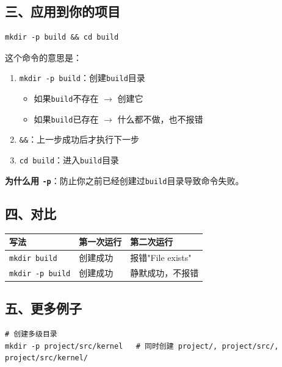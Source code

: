 \documentclass[11pt, a4paper]{article}
\begin{document}
\begin{aibox}
\subsection*{三、应用到你的项目}

\begin{tcolorbox}[colback=white,colframe=gray!50!white,boxrule=0.5pt,arc=2pt,left=5pt,right=5pt,top=5pt,bottom=5pt]
\begin{verbatim}
mkdir -p build && cd build
\end{verbatim}
\end{tcolorbox}

这个命令的意思是：
\begin{enumerate}
    \item \texttt{mkdir -p build}：创建\texttt{build}目录
    \begin{itemize}
        \item 如果\texttt{build}不存在 $\rightarrow$ 创建它
        \item 如果\texttt{build}已存在 $\rightarrow$ 什么都不做，也不报错
    \end{itemize}
    \item \texttt{\&\&}：上一步成功后才执行下一步
    \item \texttt{cd build}：进入\texttt{build}目录
\end{enumerate}

\textbf{为什么用 \texttt{-p}}：防止你之前已经创建过\texttt{build}目录导致命令失败。

\subsection*{四、对比}

\vspace{0.5em}
\begin{tabularx}{\textwidth}{@{} l X X @{}}
\toprule
写法 & 第一次运行 & 第二次运行 \\
\midrule
\texttt{mkdir build} & 创建成功 & 报错"File exists" \\
\texttt{mkdir -p build} & 创建成功 & 静默成功，不报错 \\
\bottomrule
\end{tabularx}
\vspace{0.5em}

\subsection*{五、更多例子}

\begin{tcolorbox}[colback=white,colframe=gray!50!white,boxrule=0.5pt,arc=2pt,left=5pt,right=5pt,top=5pt,bottom=5pt]
\begin{verbatim}
# 创建多级目录
mkdir -p project/src/kernel   # 同时创建 project/, project/src/, project/src/kernel/


\end{verbatim}
\end{tcolorbox}
\end{aibox}
\end{document}
